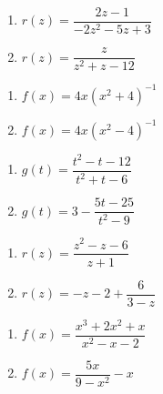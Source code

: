 \documentclass{ximera}
\begin{document}
\begin{enumerate}
\setcounter{enumi}{\value{HW}}

\item $r(z) = \dfrac{2z - 1}{-2z^{2} - 5z + 3}$
\item $r(z) = \dfrac{z}{z^{2} + z - 12}$ 

\setcounter{HW}{\value{enumi}}
\end{enumerate}

\begin{enumerate}
\setcounter{enumi}{\value{HW}}

\item $f(x) = 4x(x^2+4)^{-1}$
\item $f(x) = 4x(x^2-4)^{-1}$

\setcounter{HW}{\value{enumi}}
\end{enumerate}

\begin{enumerate}
\setcounter{enumi}{\value{HW}}

\item $g(t) = \dfrac{t^2-t-12}{t^2+t-6}$
\item $g(t) = 3- \dfrac{5t-25}{t^2-9}$

\setcounter{HW}{\value{enumi}}
\end{enumerate}

\begin{enumerate}
\setcounter{enumi}{\value{HW}}

\item $r(z) = \dfrac{z^2-z-6}{z+1}$

\item $r(z) =-z-2+\dfrac{6}{3-z}$

\setcounter{HW}{\value{enumi}}
\end{enumerate}

\begin{enumerate}
\setcounter{enumi}{\value{HW}}

\item $f(x) = \dfrac{x^3+2x^2+x}{x^2-x-2}$

\item $f(x) = \dfrac{5x}{9-x^2} - x$

\setcounter{HW}{\value{enumi}}
\end{enumerate}
\end{document}
